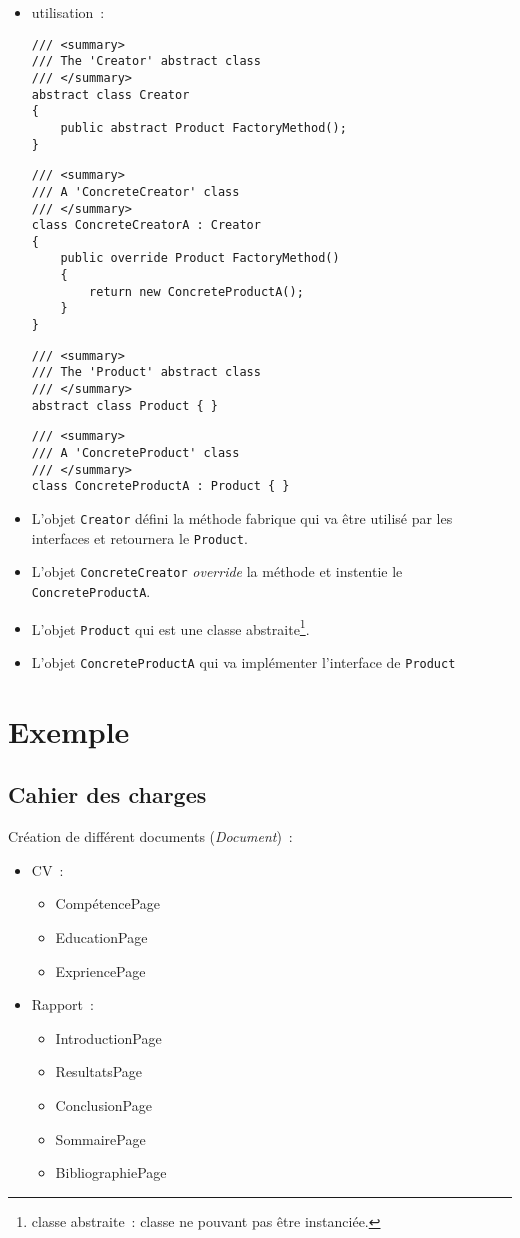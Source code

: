 \documentclass[a4paper,12pt]{article}
\begin{document}
\begin{itemize}
\item utilisation~:
\begin{lstlisting}
/// <summary>
/// The 'Creator' abstract class
/// </summary>
abstract class Creator
{
    public abstract Product FactoryMethod();
}
\end{lstlisting}
\begin{lstlisting}
/// <summary>
/// A 'ConcreteCreator' class
/// </summary>
class ConcreteCreatorA : Creator
{
    public override Product FactoryMethod()
    {
        return new ConcreteProductA();
    }
}
\end{lstlisting}
\begin{lstlisting}
/// <summary>
/// The 'Product' abstract class
/// </summary>
abstract class Product { }
\end{lstlisting}
\begin{lstlisting}
/// <summary>
/// A 'ConcreteProduct' class
/// </summary>
class ConcreteProductA : Product { }
\end{lstlisting}
\item L'objet \texttt{Creator} défini la méthode fabrique qui va être utilisé par les interfaces et retournera le \texttt{Product}.~
\item L'objet \texttt{ConcreteCreator} \textit{override} la méthode et instentie le \texttt{ConcreteProductA}.
\item L'objet \texttt{Product} qui est une classe abstraite\footnote{classe abstraite~: classe ne pouvant pas être instanciée.}.
\item L'objet \texttt{ConcreteProductA} qui va implémenter l'interface de \texttt{Product}

\end{itemize}

\section{Exemple}
\subsection{Cahier des charges}
Création de différent documents (\emph{Document})~:
\begin{itemize}
    \item CV~:
    \begin{itemize}
        \item CompétencePage
        \item EducationPage
        \item ExpriencePage
    \end{itemize}
\end{itemize}
\begin{itemize}
    \item Rapport~:
    \begin{itemize}
        \item IntroductionPage
        \item ResultatsPage
        \item ConclusionPage
        \item SommairePage
        \item BibliographiePage
    \end{itemize}
\end{itemize}
\end{document}
